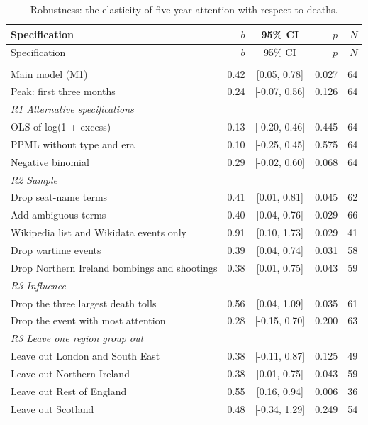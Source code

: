 \documentclass[11pt,a4paper]{article}
\begin{document}
\begin{longtable}{p{8.6cm}rcrr}\caption{Robustness: the elasticity of five-year attention with respect to deaths.}\label{tab:robust}\\\toprule Specification & $b$ & 95\% CI & $p$ & $N$\\\midrule\endfirsthead\toprule Specification & $b$ & 95\% CI & $p$ & $N$\\\midrule\endhead\bottomrule\endfoot
\multicolumn{5}{l}{\textit{Planned models}}\\
\quad Main model (M1) & 0.42 & [0.05, 0.78] & 0.027 & 64\\
\quad Peak: first three months & 0.24 & [-0.07, 0.56] & 0.126 & 64\\
\multicolumn{5}{l}{\textit{R1 Alternative specifications}}\\
\quad OLS of log(1 + excess) & 0.13 & [-0.20, 0.46] & 0.445 & 64\\
\quad PPML without type and era & 0.10 & [-0.25, 0.45] & 0.575 & 64\\
\quad Negative binomial & 0.29 & [-0.02, 0.60] & 0.068 & 64\\
\multicolumn{5}{l}{\textit{R2 Sample}}\\
\quad Drop seat-name terms & 0.41 & [0.01, 0.81] & 0.045 & 62\\
\quad Add ambiguous terms & 0.40 & [0.04, 0.76] & 0.029 & 66\\
\quad Wikipedia list and Wikidata events only & 0.91 & [0.10, 1.73] & 0.029 & 41\\
\quad Drop wartime events & 0.39 & [0.04, 0.74] & 0.031 & 58\\
\quad Drop Northern Ireland bombings and shootings & 0.38 & [0.01, 0.75] & 0.043 & 59\\
\multicolumn{5}{l}{\textit{R3 Influence}}\\
\quad Drop the three largest death tolls & 0.56 & [0.04, 1.09] & 0.035 & 61\\
\quad Drop the event with most attention & 0.28 & [-0.15, 0.70] & 0.200 & 63\\
\multicolumn{5}{l}{\textit{R3 Leave one region group out}}\\
\quad Leave out London and South East & 0.38 & [-0.11, 0.87] & 0.125 & 49\\
\quad Leave out Northern Ireland & 0.38 & [0.01, 0.75] & 0.043 & 59\\
\quad Leave out Rest of England & 0.55 & [0.16, 0.94] & 0.006 & 36\\
\quad Leave out Scotland & 0.48 & [-0.34, 1.29] & 0.249 & 54\\

\end{longtable}
\end{document}
